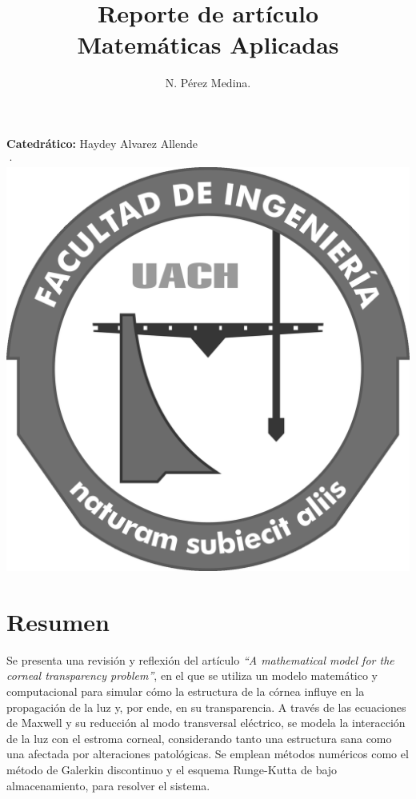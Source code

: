 \documentclass[10pt,a4paper]{article}
\title{Reporte de artículo\\Matemáticas Aplicadas}
\author{N. Pérez Medina.}
\begin{document}
\maketitle
\begin{center}
	\textbf{Catedrático:} Haydey Alvarez Allende \\
·	\\
	\includegraphics[scale=0.05]{fing-escudo-bw.png} 
\end{center}
\newpage
\tableofcontents
\newpage
\section{Resumen}
Se presenta una revisión y reflexión del artículo \textit{“A mathematical model for the corneal transparency problem”}, en el que se utiliza un modelo matemático y computacional para simular cómo la estructura de la córnea influye en la propagación de la luz y, por ende, en su transparencia. A través de las ecuaciones de Maxwell y su reducción al modo transversal eléctrico, se modela la interacción de la luz con el estroma corneal, considerando tanto una estructura sana como una afectada por alteraciones patológicas. Se emplean métodos numéricos como el método de Galerkin discontinuo y el esquema Runge-Kutta de bajo almacenamiento, para resolver el sistema.
\end{document}
